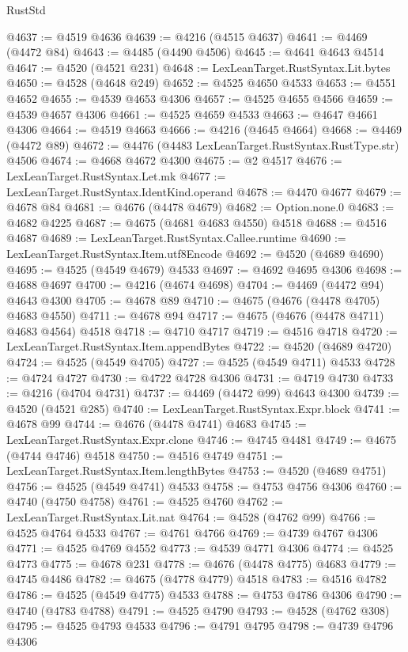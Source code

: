 \begin{lexlean}{RustStd}
\begin{coremodule}
{\begin{coremodule}
{{{{{{{{{{{{{{{{{{{{{{{{{{{{{{{{{{{{{{{{{{{{{{{{{{{{{{{{{{{{@4637 := @4519 @4636
@4639 := @4216 (@4515 @4637)
@4641 := @4469 (@4472 @84)
@4643 := @4485 (@4490 @4506)
@4645 := @4641 @4643 @4514
@4647 := @4520 (@4521 @231)
@4648 := LexLeanTarget.RustSyntax.Lit.bytes
@4650 := @4528 (@4648 @249)
@4652 := @4525 @4650 @4533
@4653 := @4551 @4652
@4655 := @4539 @4653 @4306
@4657 := @4525 @4655 @4566
@4659 := @4539 @4657 @4306
@4661 := @4525 @4659 @4533
@4663 := @4647 @4661 @4306
@4664 := @4519 @4663
@4666 := @4216 (@4645 @4664)
@4668 := @4469 (@4472 @89)
@4672 := @4476 (@4483 LexLeanTarget.RustSyntax.RustType.str) @4506
@4674 := @4668 @4672 @4300
@4675 := @2 @4517
@4676 := LexLeanTarget.RustSyntax.Let.mk
@4677 := LexLeanTarget.RustSyntax.IdentKind.operand
@4678 := @4470 @4677
@4679 := @4678 @84
@4681 := @4676 (@4478 @4679)
@4682 := Option.none.{0}
@4683 := @4682 @4225
@4687 := @4675 (@4681 @4683 @4550) @4518
@4688 := @4516 @4687
@4689 := LexLeanTarget.RustSyntax.Callee.runtime
@4690 := LexLeanTarget.RustSyntax.Item.utf8Encode
@4692 := @4520 (@4689 @4690)
@4695 := @4525 (@4549 @4679) @4533
@4697 := @4692 @4695 @4306
@4698 := @4688 @4697
@4700 := @4216 (@4674 @4698)
@4704 := @4469 (@4472 @94) @4643 @4300
@4705 := @4678 @89
@4710 := @4675 (@4676 (@4478 @4705) @4683 @4550)
@4711 := @4678 @94
@4717 := @4675 (@4676 (@4478 @4711) @4683 @4564) @4518
@4718 := @4710 @4717
@4719 := @4516 @4718
@4720 := LexLeanTarget.RustSyntax.Item.appendBytes
@4722 := @4520 (@4689 @4720)
@4724 := @4525 (@4549 @4705)
@4727 := @4525 (@4549 @4711) @4533
@4728 := @4724 @4727
@4730 := @4722 @4728 @4306
@4731 := @4719 @4730
@4733 := @4216 (@4704 @4731)
@4737 := @4469 (@4472 @99) @4643 @4300
@4739 := @4520 (@4521 @285)
@4740 := LexLeanTarget.RustSyntax.Expr.block
@4741 := @4678 @99
@4744 := @4676 (@4478 @4741) @4683
@4745 := LexLeanTarget.RustSyntax.Expr.clone
@4746 := @4745 @4481
@4749 := @4675 (@4744 @4746) @4518
@4750 := @4516 @4749
@4751 := LexLeanTarget.RustSyntax.Item.lengthBytes
@4753 := @4520 (@4689 @4751)
@4756 := @4525 (@4549 @4741) @4533
@4758 := @4753 @4756 @4306
@4760 := @4740 (@4750 @4758)
@4761 := @4525 @4760
@4762 := LexLeanTarget.RustSyntax.Lit.nat
@4764 := @4528 (@4762 @99)
@4766 := @4525 @4764 @4533
@4767 := @4761 @4766
@4769 := @4739 @4767 @4306
@4771 := @4525 @4769 @4552
@4773 := @4539 @4771 @4306
@4774 := @4525 @4773
@4775 := @4678 @231
@4778 := @4676 (@4478 @4775) @4683
@4779 := @4745 @4486
@4782 := @4675 (@4778 @4779) @4518
@4783 := @4516 @4782
@4786 := @4525 (@4549 @4775) @4533
@4788 := @4753 @4786 @4306
@4790 := @4740 (@4783 @4788)
@4791 := @4525 @4790
@4793 := @4528 (@4762 @308)
@4795 := @4525 @4793 @4533
@4796 := @4791 @4795
@4798 := @4739 @4796 @4306
}}}}}}}}}}}}}}}}}}}}}}}}}}}}}}}}}}}}}}}}}}}}}}}}}}}}}}}}}}}}
\end{coremodule}}
\end{coremodule}
\end{lexlean}
